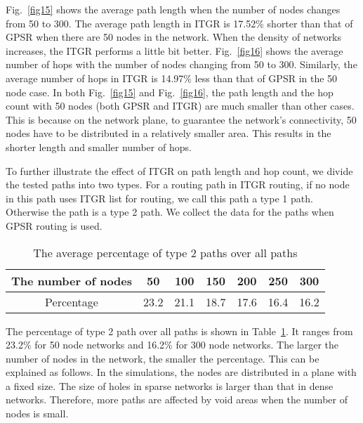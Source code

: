 \documentclass[3p,times]{elsarticle}
\begin{document}
Fig.~\ref{fig15} shows the average path length when the number of nodes changes from 50 to 300.
The average path length in ITGR is 17.52\% shorter than that of GPSR when there are 50 nodes
in the network.
When the density of networks increases, the ITGR performs a little bit better.
Fig.~\ref{fig16} shows the average number of hops with the number of nodes changing
from 50 to 300.
Similarly, the average number of hops in ITGR is 14.97\% less than that of GPSR
in the 50 node case.
In both Fig.~\ref{fig15} and Fig.~\ref{fig16}, the path length and the hop count
with 50 nodes (both GPSR and ITGR) are much smaller than other cases.
This is because on the network plane, to guarantee the network's connectivity, 50 nodes have to be
distributed in a relatively smaller area. This results in the shorter length and smaller number
of hops.


To further illustrate the effect of ITGR on path length and hop count, we divide the tested paths into two types. For a
routing path in ITGR routing, if no node in this path uses ITGR list for routing,
we call this path a type 1 path. Otherwise the path is a type 2 path.
We collect the data for the paths when GPSR routing is used.













\begin{table}[htp]
\caption{The average  percentage of type 2 paths over all paths}
\centering          \begin{tabular}{|c| c| c| c| c| c| c|}    \hline                        The number of nodes & 50 & 100 & 150 & 200 & 250 & 300 \\ [0.5ex]  \hline                     Percentage &23.2&21.1&18.7&17.6&16.4&16.2 \\      [1ex]        \hline          \end{tabular}
\label{table2}    \end{table}


The percentage of type 2
path over all paths  is shown in Table~\ref{table2}.
It ranges from 23.2\% for 50 node networks and 16.2\% for 300 node networks.
The larger the number of nodes in the network, the smaller the percentage.
This can be explained as follows.
In the simulations, the nodes are distributed in a plane with a fixed size.
The size of holes in sparse networks is larger than
that in dense networks.
Therefore, more paths are affected by void areas when the number of nodes is small.
\end{document}
